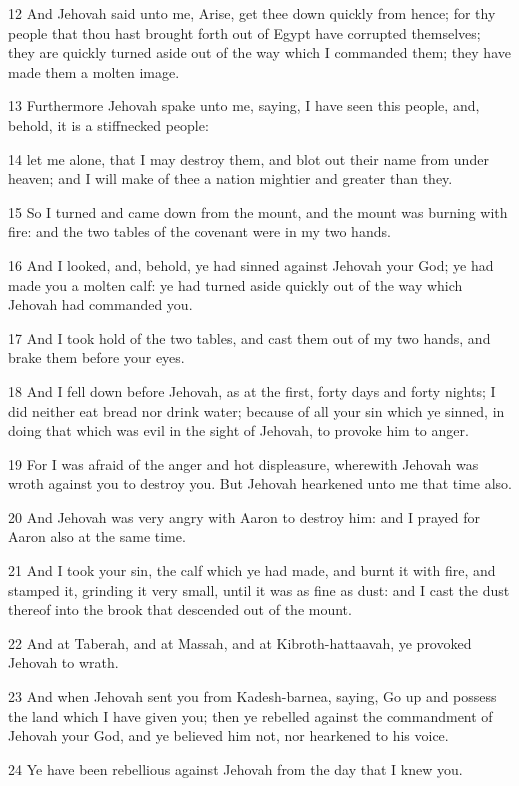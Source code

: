 \par 12 And Jehovah said unto me, Arise, get thee down quickly from hence; for thy people that thou hast brought forth out of Egypt have corrupted themselves; they are quickly turned aside out of the way which I commanded them; they have made them a molten image.
\par 13 Furthermore Jehovah spake unto me, saying, I have seen this people, and, behold, it is a stiffnecked people:
\par 14 let me alone, that I may destroy them, and blot out their name from under heaven; and I will make of thee a nation mightier and greater than they.
\par 15 So I turned and came down from the mount, and the mount was burning with fire: and the two tables of the covenant were in my two hands.
\par 16 And I looked, and, behold, ye had sinned against Jehovah your God; ye had made you a molten calf: ye had turned aside quickly out of the way which Jehovah had commanded you.
\par 17 And I took hold of the two tables, and cast them out of my two hands, and brake them before your eyes.
\par 18 And I fell down before Jehovah, as at the first, forty days and forty nights; I did neither eat bread nor drink water; because of all your sin which ye sinned, in doing that which was evil in the sight of Jehovah, to provoke him to anger.
\par 19 For I was afraid of the anger and hot displeasure, wherewith Jehovah was wroth against you to destroy you. But Jehovah hearkened unto me that time also.
\par 20 And Jehovah was very angry with Aaron to destroy him: and I prayed for Aaron also at the same time.
\par 21 And I took your sin, the calf which ye had made, and burnt it with fire, and stamped it, grinding it very small, until it was as fine as dust: and I cast the dust thereof into the brook that descended out of the mount.
\par 22 And at Taberah, and at Massah, and at Kibroth-hattaavah, ye provoked Jehovah to wrath.
\par 23 And when Jehovah sent you from Kadesh-barnea, saying, Go up and possess the land which I have given you; then ye rebelled against the commandment of Jehovah your God, and ye believed him not, nor hearkened to his voice.
\par 24 Ye have been rebellious against Jehovah from the day that I knew you.
